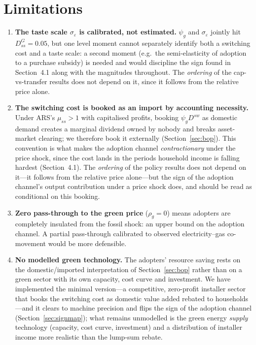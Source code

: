 \documentclass[11pt,a4paper]{article}
\begin{document}
\section{Limitations}
\label{sec:limits}

\begin{enumerate}\itemsep3pt

\item \textbf{The taste scale $\sigma_{\varepsilon}$ is calibrated, not
estimated.} $\psi_g$ and $\sigma_\varepsilon$ jointly hit $D^G_{ss}=0.05$, but
one level moment cannot separately identify both a switching cost and a taste
scale: a second moment (e.g.\ the semi-elasticity of adoption to a purchase
subsidy) is needed and would discipline the sign found in
Section~4.1 along with the magnitudes throughout. The \emph{ordering} of the
cap-vs-transfer results does not depend on it, since it follows from the
relative price alone.

\item \textbf{The switching cost is booked as an import by accounting
necessity.} Under ARS's $\mu_{ss}>1$ with capitalised profits, booking
$\psi_g D^{sw}$ as domestic demand creates a marginal dividend owned by nobody
and breaks asset-market clearing; we therefore book it externally
(Section~\ref{sec:bop}). This convention is what makes the adoption channel
\emph{contractionary} under the price shock, since the cost lands in the
periods household income is falling hardest (Section~4.1). The \emph{ordering}
of the policy results does not depend on it---it follows from the relative
price alone---but the sign of the adoption channel's output contribution under
a price shock does, and should be read as conditional on this booking.

\item \textbf{Zero pass-through to the green price} ($\rho_g=0$) means
adopters are completely insulated from the fossil shock: an upper bound on
the adoption channel. A partial pass-through calibrated to observed
electricity--gas co-movement would be more defensible.

\item \textbf{No modelled green technology.} The adopters' resource saving
rests on the domestic/imported interpretation of Section~\ref{sec:bop} rather
than on a green sector with its own capacity, cost curve and investment. We
have implemented the minimal version---a competitive, zero-profit installer
sector that books the switching cost as domestic value added rebated to
households---and it clears to machine precision and flips the sign of the
adoption channel (Section~\ref{sec:signmap}); what remains unmodelled is the
green energy \emph{supply} technology (capacity, cost curve, investment) and a
distribution of installer income more realistic than the lump-sum rebate.


\end{enumerate}
\end{document}
